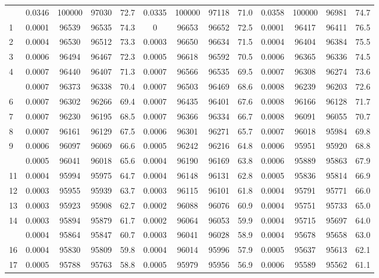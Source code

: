 \documentclass[
  14pt,
]{article}
\begin{document}
\begin{longtable}[t]{lcccccccccccc}
\endfoot
\bottomrule
\endlastfoot
0 & 0.0346 & 100000 & 97030 & 72.7 & 0.0335 & 100000 & 97118 & 71.0 & 0.0358 & 100000 & 96981 & 74.7\\
1 & 0.0001 & 96539 & 96535 & 74.3 & 0 & 96653 & 96652 & 72.5 & 0.0001 & 96417 & 96411 & 76.5\\
2 & 0.0004 & 96530 & 96512 & 73.3 & 0.0003 & 96650 & 96634 & 71.5 & 0.0004 & 96404 & 96384 & 75.5\\
3 & 0.0006 & 96494 & 96467 & 72.3 & 0.0005 & 96618 & 96592 & 70.5 & 0.0006 & 96365 & 96336 & 74.5\\
4 & 0.0007 & 96440 & 96407 & 71.3 & 0.0007 & 96566 & 96535 & 69.5 & 0.0007 & 96308 & 96274 & 73.6\\
\addlinespace
5 & 0.0007 & 96373 & 96338 & 70.4 & 0.0007 & 96503 & 96469 & 68.6 & 0.0008 & 96239 & 96203 & 72.6\\
6 & 0.0007 & 96302 & 96266 & 69.4 & 0.0007 & 96435 & 96401 & 67.6 & 0.0008 & 96166 & 96128 & 71.7\\
7 & 0.0007 & 96230 & 96195 & 68.5 & 0.0007 & 96366 & 96334 & 66.7 & 0.0008 & 96091 & 96055 & 70.7\\
8 & 0.0007 & 96161 & 96129 & 67.5 & 0.0006 & 96301 & 96271 & 65.7 & 0.0007 & 96018 & 95984 & 69.8\\
9 & 0.0006 & 96097 & 96069 & 66.6 & 0.0005 & 96242 & 96216 & 64.8 & 0.0006 & 95951 & 95920 & 68.8\\
\addlinespace
10 & 0.0005 & 96041 & 96018 & 65.6 & 0.0004 & 96190 & 96169 & 63.8 & 0.0006 & 95889 & 95863 & 67.9\\
11 & 0.0004 & 95994 & 95975 & 64.7 & 0.0004 & 96148 & 96131 & 62.8 & 0.0005 & 95836 & 95814 & 66.9\\
12 & 0.0003 & 95955 & 95939 & 63.7 & 0.0003 & 96115 & 96101 & 61.8 & 0.0004 & 95791 & 95771 & 66.0\\
13 & 0.0003 & 95923 & 95908 & 62.7 & 0.0002 & 96088 & 96076 & 60.9 & 0.0004 & 95751 & 95733 & 65.0\\
14 & 0.0003 & 95894 & 95879 & 61.7 & 0.0002 & 96064 & 96053 & 59.9 & 0.0004 & 95715 & 95697 & 64.0\\
\addlinespace
15 & 0.0004 & 95864 & 95847 & 60.7 & 0.0003 & 96041 & 96028 & 58.9 & 0.0004 & 95678 & 95658 & 63.0\\
16 & 0.0004 & 95830 & 95809 & 59.8 & 0.0004 & 96014 & 95996 & 57.9 & 0.0005 & 95637 & 95613 & 62.1\\
17 & 0.0005 & 95788 & 95763 & 58.8 & 0.0005 & 95979 & 95956 & 56.9 & 0.0006 & 95589 & 95562 & 61.1\\

\end{longtable}
\end{document}
